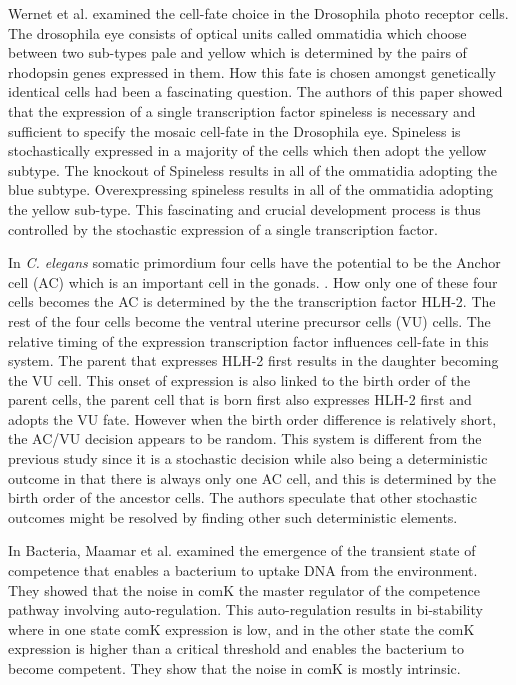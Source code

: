 Wernet et al. \cite{wernet_stochastic_2006} examined the cell-fate choice in the Drosophila photo receptor cells. The drosophila eye consists of optical units called ommatidia which choose between two sub-types pale and yellow which is determined by the pairs of rhodopsin genes expressed in them. How this fate is chosen amongst genetically identical cells had been a fascinating question. The authors of this paper showed that the expression of a single transcription factor spineless is necessary and sufficient to specify the mosaic cell-fate in the Drosophila eye. Spineless is stochastically expressed in a majority of the cells which then adopt the yellow subtype. The knockout of Spineless results in all of the ommatidia adopting the blue subtype. Overexpressing spineless results in all of the ommatidia adopting the yellow sub-type. This fascinating and crucial development process is thus controlled by the stochastic expression of a single transcription factor.

In \emph{C. elegans} somatic primordium four cells have the potential to be the Anchor cell (AC) which is an important cell in the gonads. \cite{attner2019cb}. How only one of these four cells becomes the AC is determined by the the transcription factor HLH-2. The rest of the four cells become the ventral uterine precursor cells (VU) cells. The relative timing of the expression transcription factor influences cell-fate in this system. The parent that expresses HLH-2 first results in the daughter becoming the VU cell. This onset of expression is also linked to the birth order of the parent cells, the parent cell that is born first also expresses HLH-2 first and adopts the VU fate. However when the birth order difference is  relatively short, the AC/VU decision appears to be random. This system is different from the previous study since it is a stochastic decision while also being a deterministic outcome in that there is always only one AC cell, and this is determined by the birth order of the ancestor cells. The authors speculate that other stochastic outcomes might be resolved by finding other such deterministic elements. 

In Bacteria, Maamar et al. \cite{maamar2007s} examined the emergence of the transient state of competence that enables a bacterium to uptake DNA from the environment. They showed that the noise in comK the master regulator of the competence pathway involving auto-regulation. This auto-regulation results in bi-stability where in one state comK expression is low, and in the other state the comK expression is higher than a critical threshold and enables the bacterium to become competent. They show that the noise in comK is mostly intrinsic.

